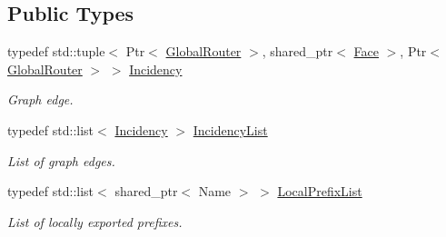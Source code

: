 \subsection*{Public Types}
\begin{DoxyCompactItemize}
\item 
typedef std\+::tuple$<$ Ptr$<$ \hyperlink{classns3_1_1ndn_1_1GlobalRouter}{Global\+Router} $>$, shared\+\_\+ptr$<$ \hyperlink{classnfd_1_1Face}{Face} $>$, Ptr$<$ \hyperlink{classns3_1_1ndn_1_1GlobalRouter}{Global\+Router} $>$ $>$ \hyperlink{classns3_1_1ndn_1_1GlobalRouter_a9254e959f876b01f8d70f77ad04a071a}{Incidency}\hypertarget{classns3_1_1ndn_1_1GlobalRouter_a9254e959f876b01f8d70f77ad04a071a}{}\label{classns3_1_1ndn_1_1GlobalRouter_a9254e959f876b01f8d70f77ad04a071a}

\begin{DoxyCompactList}\small\item\em Graph edge. \end{DoxyCompactList}\item 
typedef std\+::list$<$ \hyperlink{classns3_1_1ndn_1_1GlobalRouter_a9254e959f876b01f8d70f77ad04a071a}{Incidency} $>$ \hyperlink{classns3_1_1ndn_1_1GlobalRouter_a48a657a3cc734401b488ace8b6cd2ddb}{Incidency\+List}\hypertarget{classns3_1_1ndn_1_1GlobalRouter_a48a657a3cc734401b488ace8b6cd2ddb}{}\label{classns3_1_1ndn_1_1GlobalRouter_a48a657a3cc734401b488ace8b6cd2ddb}

\begin{DoxyCompactList}\small\item\em List of graph edges. \end{DoxyCompactList}\item 
typedef std\+::list$<$ shared\+\_\+ptr$<$ Name $>$ $>$ \hyperlink{classns3_1_1ndn_1_1GlobalRouter_a06c10324453a7a931a105fba937ba9b8}{Local\+Prefix\+List}\hypertarget{classns3_1_1ndn_1_1GlobalRouter_a06c10324453a7a931a105fba937ba9b8}{}\label{classns3_1_1ndn_1_1GlobalRouter_a06c10324453a7a931a105fba937ba9b8}

\begin{DoxyCompactList}\small\item\em List of locally exported prefixes. \end{DoxyCompactList}\end{DoxyCompactItemize}
